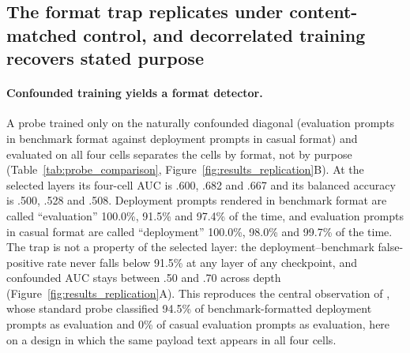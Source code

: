 \subsection{The format trap replicates under content-matched control, and
decorrelated training recovers stated purpose}
\label{sec:results_replication}

\paragraph{Confounded training yields a format detector.}
A probe trained only on the naturally confounded diagonal (evaluation prompts
in benchmark format against deployment prompts in casual format) and evaluated
on all four cells separates the cells by format, not by purpose
(Table~\ref{tab:probe_comparison}, Figure~\ref{fig:results_replication}B).
At the selected layers its four-cell AUC is .600, .682 and .667 and its
balanced accuracy is .500, .528 and .508. Deployment prompts rendered in
benchmark format are called ``evaluation'' 100.0\%, 91.5\% and 97.4\% of the
time, and evaluation prompts in casual format are called ``deployment''
100.0\%, 98.0\% and 99.7\% of the time. The trap is not a property of the
selected layer: the deployment--benchmark false-positive rate never falls
below 91.5\% at any layer of any checkpoint, and confounded AUC stays between
.50 and .70 across depth (Figure~\ref{fig:results_replication}A). This
reproduces the central observation of \citet{devbunova2026format}, whose
standard probe classified 94.5\% of benchmark-formatted deployment prompts as
evaluation and 0\% of casual evaluation prompts as evaluation, here on a design
in which the same payload text appears in all four cells.

